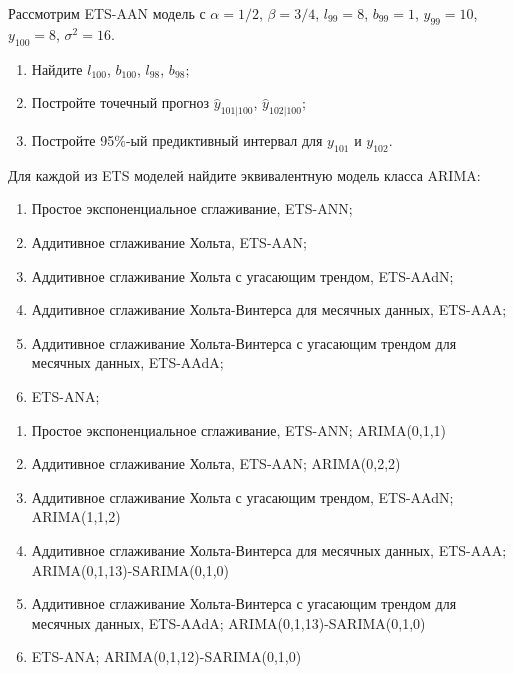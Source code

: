 \begin{problem}
  Рассмотрим ETS-AAN модель с $\alpha = 1/2$, $\beta=3/4$, $l_{99}=8$, $b_{99}=1$, $y_{99}=10$, $y_{100}=8$, $\sigma^2=16$.
  \begin{enumerate}
    \item Найдите $l_{100}$, $b_{100}$, $l_{98}$, $b_{98}$;
    \item Постройте точечный прогноз $\hat y_{101|100}$, $\hat y_{102|100}$;
    \item Постройте 95\%-ый предиктивный интервал для $y_{101}$ и $y_{102}$.
  \end{enumerate}
\begin{sol}
\end{sol}
\end{problem}


\begin{problem}
Для каждой из ETS моделей найдите эквивалентную модель класса ARIMA:
	\begin{enumerate}
		\item Простое экспоненциальное сглаживание, ETS-ANN;
		\item Аддитивное сглаживание Хольта, ETS-AAN;
		\item Аддитивное сглаживание Хольта с угасающим трендом, ETS-AAdN;
		\item Аддитивное сглаживание Хольта-Винтерса для месячных данных, ETS-AAA;
		\item Аддитивное сглаживание Хольта-Винтерса с угасающим трендом для месячных данных, ETS-AAdA;
		\item ETS-ANA;
	\end{enumerate}
\begin{sol}
	\begin{enumerate}
		\item Простое экспоненциальное сглаживание, ETS-ANN; ARIMA(0,1,1)
		\item Аддитивное сглаживание Хольта, ETS-AAN; ARIMA(0,2,2)
		\item Аддитивное сглаживание Хольта с угасающим трендом, ETS-AAdN; ARIMA(1,1,2)
		\item Аддитивное сглаживание Хольта-Винтерса для месячных данных, ETS-AAA; ARIMA(0,1,13)-SARIMA(0,1,0)
		\item Аддитивное сглаживание Хольта-Винтерса с угасающим трендом для месячных данных, ETS-AAdA; ARIMA(0,1,13)-SARIMA(0,1,0)
		\item ETS-ANA; ARIMA(0,1,12)-SARIMA(0,1,0)
	\end{enumerate}
\end{sol}
\end{problem}


